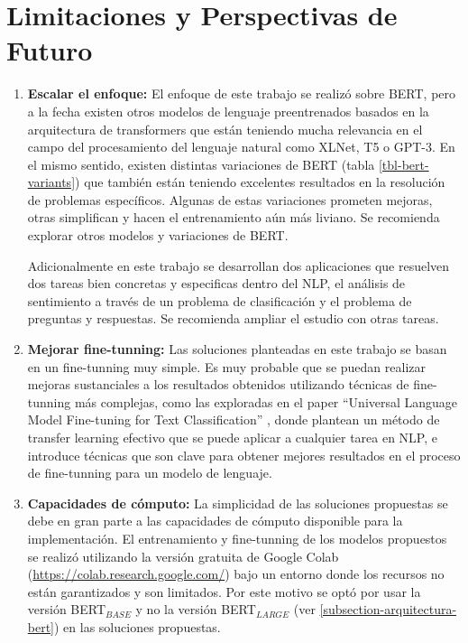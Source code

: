 

\chapter{Limitaciones y Perspectivas de Futuro}
\label{chapter-limitaciones-futuro}

\begin{enumerate}
    \item \textbf{Escalar el enfoque:} El enfoque de este trabajo se realizó sobre BERT, pero a la fecha existen otros modelos de lenguaje preentrenados basados en la arquitectura de transformers que están teniendo mucha relevancia en el campo del procesamiento del lenguaje natural como XLNet, T5 o GPT-3. En el mismo sentido, existen distintas variaciones de BERT (tabla \ref{tbl-bert-variants}) que también están teniendo excelentes resultados en la resolución de problemas específicos. Algunas de estas variaciones prometen mejoras, otras simplifican y hacen el entrenamiento aún más liviano. Se recomienda explorar otros modelos y variaciones de BERT.
    
    Adicionalmente en este trabajo se desarrollan dos aplicaciones que resuelven dos tareas bien concretas y especificas dentro del NLP, el análisis de sentimiento a través de un problema de clasificación y el problema de preguntas y respuestas. Se recomienda ampliar el estudio con otras tareas. 
    
    \item \textbf{Mejorar fine-tunning:} Las soluciones planteadas en este trabajo se basan en un fine-tunning muy simple. Es muy probable que se puedan realizar mejoras sustanciales a los resultados obtenidos utilizando técnicas de fine-tunning más complejas, como las exploradas en el paper ``Universal Language Model Fine-tuning for Text Classification'' \citep{ULMFit_https://doi.org/10.48550/arxiv.1801.06146}, donde plantean un método de transfer learning efectivo que se puede aplicar a cualquier tarea en NLP, e introduce técnicas que son clave para obtener mejores resultados en el proceso de fine-tunning para un modelo de lenguaje.
    
    \item \textbf{Capacidades de cómputo:} La simplicidad de las soluciones propuestas se debe en gran parte a las capacidades de cómputo disponible para la implementación. El entrenamiento y fine-tunning de los modelos propuestos se realizó utilizando la versión gratuita de Google Colab (\url{https://colab.research.google.com/}) bajo un entorno donde los recursos no están garantizados y son limitados. Por este motivo se optó por usar la versión BERT$_{BASE}$ y no la versión BERT$_{LARGE}$ (ver \ref{subsection-arquitectura-bert}) en las soluciones propuestas. 
\end{enumerate}
